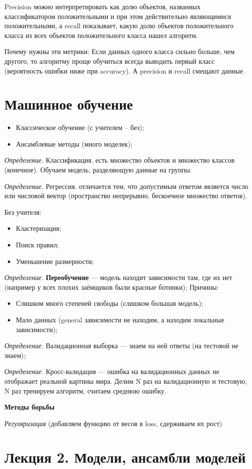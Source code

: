 \documentclass[a4paper,14pt]{article}
\begin{document}
Precision можно интерпретировать как долю объектов, названных классификатором положительными и при этом действительно являющимися положительными, а recall показывает, какую долю объектов положительного класса из всех объектов положительного класса нашел алгоритм.

Почему нужны эти метрики: Если данных одного класса сильно больше, чем другого, то алгоритму проще обучиться всегда выводить первый класс (вероятность ошибки ниже при accuracy). А precision и recall смещают данные.

\section{Машинное обучение}
\begin{itemize}
    \item Классическое обучение (с учителем -- без);
    \item Ансамблевые методы (много моделек);
\end{itemize}

{\it Определение.}  Классификация. есть множество объектов и множество классов (конечное). Обучаем модель, разделяющую данные на группы.

{\it Определение.}  Регрессия. отличается тем, что допустимым ответом является число или числовой вектор (пространство непрерывно, бескоечное множество ответов).

Без учителя:
\begin{itemize}
    \item Кластеризация;
    \item Поиск правил;
    \item Уменьшение размерности;
\end{itemize}


{\it Определение.} {\bf Переобучение } --- модель находит зависимости там, где их нет (например у всех плохих заёмщиков были красные ботинки);
Причины:
\begin{itemize}
    \item Слишком много степеней свободы (слишком большая модель);
    \item Мало данных (general зависимости не находим, а находим локальные зависимости);
\end{itemize}

{\it Определение.} Валидационная выборка --- знаем на ней ответы (на тестовой не знаем);

{\it Определение.} Кросс-валидация --- ошибка на валидационных данных не отображает реальной картины мира.
Делим N раз на валидационную и тестовую, N раз тренируем алгоритм, считаем среднюю ошибку.

{\bf Методы борьбы}

{\it Регуляризация} (добавляем функцию от весов в loss, сдерживаем их рост)

\newpage
\section{ Лекция 2. Модели, ансамбли моделей }
    \subsection{}
\end{document}
